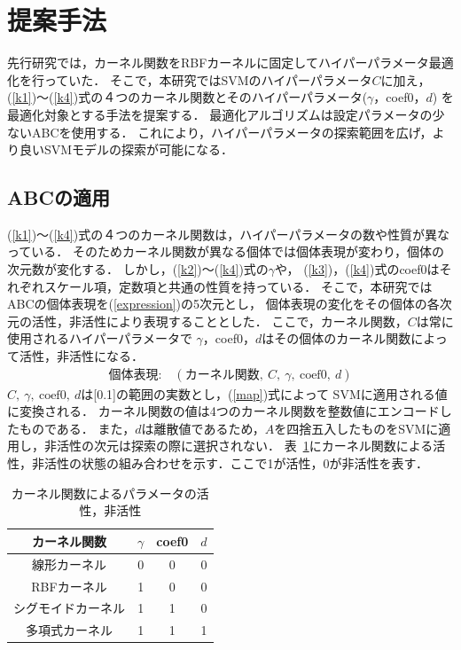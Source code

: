 \section{提案手法}
先行研究では，カーネル関数をRBFカーネルに固定してハイパーパラメータ最適化を行っていた．
そこで，本研究ではSVMのハイパーパラメータ$C$に加え，
(\ref{k1})〜(\ref{k4})式の４つのカーネル関数とそのハイパーパラメータ($\gamma$，coef0，$d$)
を最適化対象とする手法を提案する．
最適化アルゴリズムは設定パラメータの少ないABCを使用する．
これにより，ハイパーパラメータの探索範囲を広げ，より良いSVMモデルの探索が可能になる．
\subsection{ABCの適用}
(\ref{k1})〜(\ref{k4})式の４つのカーネル関数は，ハイパーパラメータの数や性質が異なっている．
そのためカーネル関数が異なる個体では個体表現が変わり，個体の次元数が変化する．
しかし，(\ref{k2})〜(\ref{k4})式の$\gamma$や，
(\ref{k3})，(\ref{k4})式のcoef0はそれぞれスケール項，定数項と共通の性質を持っている．
そこで，本研究ではABCの個体表現を(\ref{expression})の5次元とし，
個体表現の変化をその個体の各次元の活性，非活性により表現することとした．
ここで，カーネル関数，$C$は常に使用されるハイパーパラメータで
$\gamma$，coef0，$d$はその個体のカーネル関数によって活性，非活性になる．
\begin{align}
    \text{個体表現:} \quad  (\text{カーネル関数},~C,~\gamma,~\text{coef0},~d)\label{expression}
\end{align}
$C,~\gamma,~\text{coef0},~d$は[0.1]の範囲の実数とし，(\ref{map})式によって
SVMに適用される値に変換される．
カーネル関数の値は4つのカーネル関数を整数値にエンコードしたものである．
また，$d$は離散値であるため，$A$を四捨五入したものをSVMに適用し，非活性の次元は探索の際に選択されない．
表~\ref{tab:param}にカーネル関数による活性，非活性の状態の組み合わせを示す．ここで1が活性，0が非活性を表す．
\begin{table}[t]
    \centering
    \caption{カーネル関数によるパラメータの活性，非活性}  %
    \begin{tabular}{|c|c|c|c|}  %
        \hline  %
        カーネル関数 & $\gamma$ & coef0 & $d$\\  %
        \hline  %
        線形カーネル& 0& 0& 0\\  %
        \hline  %
        RBFカーネル & 1 & 0& 0\\  %
        \hline  %
        シグモイドカーネル & 1 & 1& 0\\  %
        \hline  %
        多項式カーネル & 1 & 1& 1\\  %
        \hline  %
    \end{tabular}
    
    \label{tab:param}  %
  \end{table} %
  
